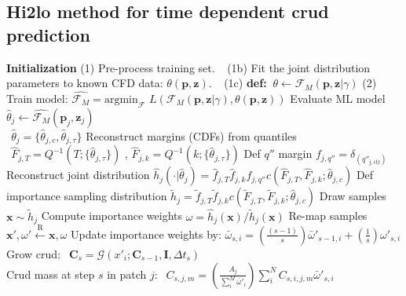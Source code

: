 \documentclass[t, pdftex]{beamer}
\begin{document}
\subsection*{Hi2lo method for time dependent crud prediction}
\begin{frame}
\vspace{-16pt}
\begin{algorithm}[H]
    \tiny      
    \begin{algorithmic}[1]      
        \STATE \textbf{Initialization}  
        \STATE (1) Pre-process training set.  
        \STATE $\ \ $   (1b) Fit the joint distribution parameters to known CFD data: $\theta(\mathbf p, \mathbf z)$.  
        \STATE $\ \ $   (1c) \textbf{def:}  $\ \theta \leftarrow \mathcal F_M(\mathbf p, \mathbf z | \gamma)$
        \STATE (2) Train model:  $\hat{\mathcal F_M} =  \mathrm{argmin}_{\mathcal F}$
        $L(\mathcal{F}_M (\mathbf p, \mathbf z| \gamma), \theta(\mathbf p, \mathbf z)) $
        \STATE Evaluate ML model $\hat \theta_j \leftarrow \hat{\mathcal F_M}(\mathbf p_j, \mathbf z_j)$ \\
        $\ \ \hat \theta_j = \{\hat \theta_{j,c}, \hat \theta_{j,\tau} \}$
        \STATE Reconstruct margins (CDFs) from quantiles  \\
        $\ \ \hat F_{j,T}= Q^{-1}(T; \{\hat{\theta}_{j,\tau} \})$ , $\hat F_{j,k}= Q^{-1}(k; \{\hat{\theta}_{j,\tau} \})$
        \STATE Def $q''$ margin  $f_{j,q''} = \delta_{(q''_\mathrm{j,ctf})}$
        \STATE Reconstruct joint distribution $\hat h_j(\cdot |\hat \theta_j) = \hat f_{j,T} \hat f_{j,k} f_{j,q''} c(\hat F_{j,T}, \hat F_{j,k}; \hat \theta_{j,c})$ \;
        \ENDFOR
        \STATE Def importance sampling distribution $\tilde h_j = \tilde f_{j,T} \tilde f_{j,k} c(\tilde F_{j,T}, \tilde F_{j,k}; \hat \theta_{j,c}) $
        \STATE Draw samples $\mathbf x \sim \tilde h_j$ \;
        \STATE Compute importance weights $\omega = \hat h_j(\mathbf x) /  \tilde h_j(\mathbf x) $
        \STATE Re-map samples  $\mathbf x', \omega' \xleftarrow[\text{ }]{\text{R}} \mathbf x, \omega $
        \STATE Update importance weights by:  $\bar{\omega}_{s,i} = \left( \frac{(s-1)}{s} \right) \bar \omega'_{s-1,i} + \left( \frac{1}{s} \right) \omega'_{s,i}$
        \STATE Grow crud:
        $\ \ \mathbf C_s = \mathcal G(x'_i; \mathbf C_{s-1}, \mathbf I, \Delta t_s)$ \\
        \STATE Crud mass at step $s$ in patch $j$:
        $\ \ C_{s,j,m} = \left( \frac{A_j}{\sum_i^M \bar \omega'_i} \right) \sum_i^N C_{s,i,j,m} \bar \omega'_{s,i}$
        \ENDFOR
        \ENDFOR
        \ENDFOR
    \end{algorithmic}
    \label{algo:hi2lo_crud_algo}
\end{algorithm}
\end{frame}
\end{document}
